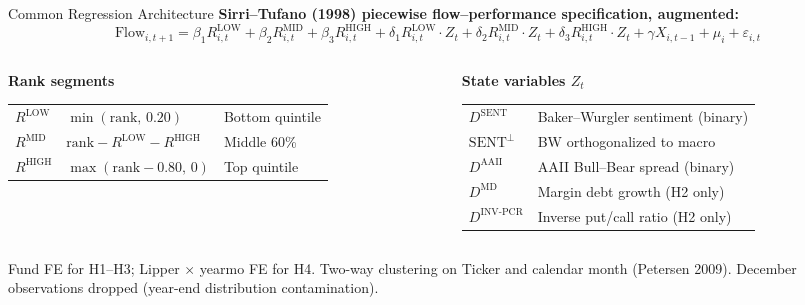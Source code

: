 \documentclass[10pt, aspectratio=169]{beamer}
\begin{document}
\begin{frame}{Common Regression Architecture}
  \textbf{Sirri–Tufano (1998) piecewise flow–performance specification, augmented:}
  \vspace{4pt}
  \[
    \text{Flow}_{i,t+1} = \beta_1 R^{\text{LOW}}_{i,t} + \beta_2 R^{\text{MID}}_{i,t}
    + \beta_3 R^{\text{HIGH}}_{i,t}
    + \delta_1 R^{\text{LOW}}_{i,t} \cdot Z_t
    + \delta_2 R^{\text{MID}}_{i,t} \cdot Z_t
    + \delta_3 R^{\text{HIGH}}_{i,t} \cdot Z_t
    + \gamma X_{i,t-1} + \mu_i + \varepsilon_{i,t}
  \]
  \vspace{2pt}
  \begin{columns}[T]
    \begin{column}{0.45\textwidth}
      \textbf{Rank segments}\\[3pt]
      \footnotesize
      \begin{tabular}{lll}
        $R^{\text{LOW}}$  & $\min(\text{rank},\,0.20)$                           & Bottom quintile \\
        $R^{\text{MID}}$  & $\text{rank} - R^{\text{LOW}} - R^{\text{HIGH}}$     & Middle 60\% \\
        $R^{\text{HIGH}}$ & $\max(\text{rank}-0.80,\,0)$                         & Top quintile \\
      \end{tabular}
    \end{column}
    \begin{column}{0.52\textwidth}
      \textbf{State variables $Z_t$}\\[3pt]
      \footnotesize
      \begin{tabular}{ll}
        $D^{\text{SENT}}$ & Baker–Wurgler sentiment (binary) \\
        $\text{SENT}^\perp$ & BW orthogonalized to macro \\
        $D^{\text{AAII}}$ & AAII Bull–Bear spread (binary) \\
        $D^{\text{MD}}$   & Margin debt growth (H2 only) \\
        $D^{\text{INV-PCR}}$ & Inverse put/call ratio (H2 only) \\
      \end{tabular}
    \end{column}
  \end{columns}
  \vspace{6pt}
  \footnotesize Fund FE for H1–H3; Lipper $\times$ yearmo FE for H4.
  Two-way clustering on Ticker and calendar month (Petersen 2009).
  December observations dropped (year-end distribution contamination).
\end{frame}
\end{document}
